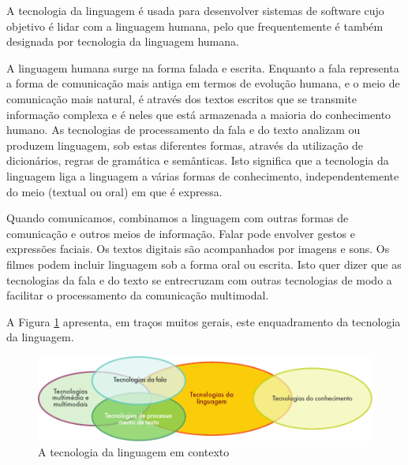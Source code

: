 \clearpage



\begin{multicols}{2}

 A tecnologia da linguagem é usada para desenvolver sistemas de software cujo objetivo é lidar com a linguagem humana, pelo que frequentemente é também designada por tecnologia da linguagem humana. 

A linguagem humana surge na forma falada e escrita. Enquanto a fala representa a forma de comunicação mais antiga em termos de evolução humana, e o meio de comunicação mais natural, é através dos textos escritos que se transmite informação complexa e é neles que está armazenada a maioria do co\-nhe\-ci\-men\-to humano. As tecnologias de processamento da fala e do texto analizam ou produzem linguagem, sob estas diferentes formas, através
da utilização de dicionários, regras de gramática e semânticas. Isto significa que a tecnologia da linguagem liga a linguagem a várias formas de co\-nhe\-ci\-men\-to, independentemente do meio (textual ou oral) em que é expressa. 

Quando comunicamos, combinamos a linguagem com outras formas de comunicação e outros meios de informação. 
Falar pode envolver gestos e expressões faciais. Os textos digitais são acompanhados por imagens e sons. 
Os filmes podem incluir linguagem sob a forma oral ou escrita. Isto quer dizer que as tecnologias da fala e do texto 
se entrecruzam com outras tecnologias de modo a facilitar o processamento da comunicação multimodal.

A Figura \ref{fig:ltincontext_de} apresenta, em traços muitos gerais, este enquadramento da tecnologia da linguagem.

\begin{figure}[htb]
  \center
  \includegraphics[width=\textwidth]{../_media/portuguese/language_technologies}
  \caption{A tecnologia da linguagem em contexto}
  \label{fig:ltincontext_de}
\end{figure}


\end{multicols}
